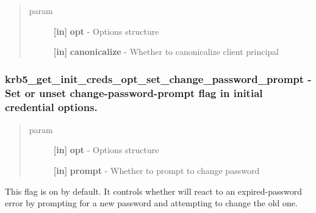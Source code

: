 \documentclass[letterpaper,10pt,english]{sphinxmanual}
\begin{document}
\begin{quote}\begin{description}
\item[{param}] \leavevmode
\textbf{{[}in{]}} \textbf{opt} - Options structure

\textbf{{[}in{]}} \textbf{canonicalize} - Whether to canonicalize client principal

\end{description}\end{quote}


\subsubsection{krb5\_get\_init\_creds\_opt\_set\_change\_password\_prompt -  Set or unset change-password-prompt flag in initial credential options.}
\label{appdev/refs/api/krb5_get_init_creds_opt_set_change_password_prompt::doc}\label{appdev/refs/api/krb5_get_init_creds_opt_set_change_password_prompt:krb5-get-init-creds-opt-set-change-password-prompt-set-or-unset-change-password-prompt-flag-in-initial-credential-options}

\begin{fulllineitems}
\label{appdev/refs/api/krb5_get_init_creds_opt_set_change_password_prompt:krb5_get_init_creds_opt_set_change_password_prompt}
\end{fulllineitems}

\begin{quote}\begin{description}
\item[{param}] \leavevmode
\textbf{{[}in{]}} \textbf{opt} - Options structure

\textbf{{[}in{]}} \textbf{prompt} - Whether to prompt to change password

\end{description}\end{quote}

This flag is on by default. It controls whether {\hyperref[appdev/refs/api/krb5_get_init_creds_password:krb5_get_init_creds_password]{}} will react to an expired-password error by prompting for a new password and attempting to change the old one.
\end{document}
